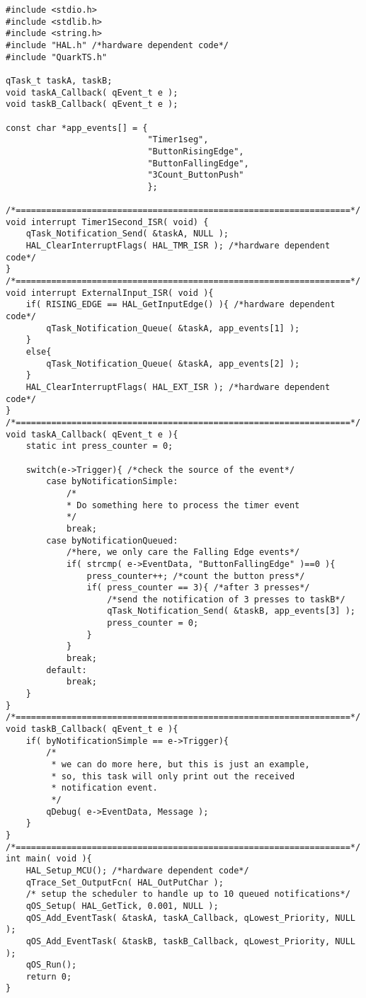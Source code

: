 \begin{lstlisting}[style=CStyle]
#include <stdio.h>
#include <stdlib.h>
#include <string.h>
#include "HAL.h" /*hardware dependent code*/
#include "QuarkTS.h"

qTask_t taskA, taskB;
void taskA_Callback( qEvent_t e );
void taskB_Callback( qEvent_t e );

const char *app_events[] = {
                            "Timer1seg", 
                            "ButtonRisingEdge", 
                            "ButtonFallingEdge", 
                            "3Count_ButtonPush"
                            };

/*==================================================================*/
void interrupt Timer1Second_ISR( void) {
    qTask_Notification_Send( &taskA, NULL );
    HAL_ClearInterruptFlags( HAL_TMR_ISR ); /*hardware dependent code*/
}
/*==================================================================*/
void interrupt ExternalInput_ISR( void ){
    if( RISING_EDGE == HAL_GetInputEdge() ){ /*hardware dependent code*/
        qTask_Notification_Queue( &taskA, app_events[1] );    
    }
    else{
        qTask_Notification_Queue( &taskA, app_events[2] );
    }
    HAL_ClearInterruptFlags( HAL_EXT_ISR ); /*hardware dependent code*/
}
/*==================================================================*/
void taskA_Callback( qEvent_t e ){
    static int press_counter = 0;
    
    switch(e->Trigger){ /*check the source of the event*/
        case byNotificationSimple: 
            /*
            * Do something here to process the timer event
            */
            break;
        case byNotificationQueued:
            /*here, we only care the Falling Edge events*/
            if( strcmp( e->EventData, "ButtonFallingEdge" )==0 ){
                press_counter++; /*count the button press*/
                if( press_counter == 3){ /*after 3 presses*/
                    /*send the notification of 3 presses to taskB*/
                    qTask_Notification_Send( &taskB, app_events[3] );
                    press_counter = 0;
                }
            }
            break;
        default:
            break;
    }
}
/*==================================================================*/
void taskB_Callback( qEvent_t e ){
    if( byNotificationSimple == e->Trigger){
        /*
         * we can do more here, but this is just an example,
         * so, this task will only print out the received 
         * notification event.
         */
        qDebug( e->EventData, Message );
    }
}
/*==================================================================*/
int main( void ){
    HAL_Setup_MCU(); /*hardware dependent code*/
    qTrace_Set_OutputFcn( HAL_OutPutChar );
    /* setup the scheduler to handle up to 10 queued notifications*/
    qOS_Setup( HAL_GetTick, 0.001, NULL ); 
    qOS_Add_EventTask( &taskA, taskA_Callback, qLowest_Priority, NULL );
    qOS_Add_EventTask( &taskB, taskB_Callback, qLowest_Priority, NULL );                     
    qOS_Run();
    return 0;
}
\end{lstlisting}

